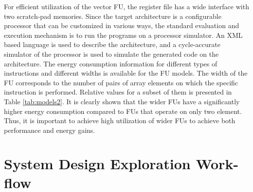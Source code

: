 \documentclass[prodmode,acmtecs]{acmsmall}
\begin{document}
For efficient utilization of the vector FU, the register file has a wide interface with two scratch-pad memories. 
Since the target architecture is a configurable processor that can be customized in various ways, the standard evaluation and execution mechanism is to run the programs on a processor simulator. 
An XML based language is used to describe the architecture, and a cycle-accurate simulator of the processor is used to simulate the generated code on the architecture. 
The energy consumption information for different types of instructions and different widths is available for the FU models.
The width of the FU corresponds to the number of pairs of array elements on which the specific instruction is performed.
Relative values for a subset of them is presented in Table \ref{tab:models2}. 
It is clearly shown that the wider FUs have a significantly higher energy consumption compared to FUs that operate on only two element.
Thus, it is important to achieve high utilization of wider FUs to achieve both performance and energy gains.

\begin{table}
\begin{tabnote}%
\end{tabnote}%
\end{table}

\section{System Design Exploration Work-flow}
\label{sec:methodology}
\end{document}
